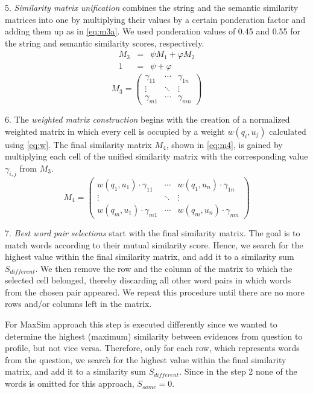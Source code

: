 \documentclass[conference]{IEEEtran}
\begin{document}
5. {\it Similarity matrix unification} combines the string and the semantic similarity matrices into one by multiplying their values by a certain ponderation factor and adding them up as in \ref{eq:m3a}. We used ponderation values of 0.45 and 0.55 for the string and semantic similarity scores, respectively.
\begin{eqnarray}
	\label{eq:m3a}
	M_3 & = & \psi M_1 + \varphi M_2 \\
	1 & = & \psi + \varphi
\end{eqnarray}
\begin{equation}
	\label{eq:m3b}
	M_3 = 
\left( 
	\begin{array}{ccc}
		\gamma_{11} & \cdots & \gamma_{1n} \\
		\vdots & \ddots & \vdots \\
		\gamma_{m1} & \cdots & \gamma_{mn} 
	\end{array} 
\right)
\end{equation}

6. The {\it weighted matrix construction} begins with the creation of a normalized weighted matrix in which every cell is occupied by a weight $w(q_i,u_j)$ calculated using \ref{eq:w}. The final similarity matrix $M_4$, shown in \ref{eq:m4}, is gained by multiplying each cell of the unified similarity matrix with the corresponding value $\gamma_{i,j}$ from $M_3$.
\begin{equation}
	\label{eq:m4}
	M_4 = 
\left( 
	\begin{array}{ccc}
		w(q_1,u_1)\cdot \gamma_{11} & \cdots & w(q_1,u_n)\cdot \gamma_{1n} \\
		\vdots & \ddots & \vdots \\
		w(q_m,u_1)\cdot \gamma_{m1} & \cdots & w(q_m,u_n)\cdot \gamma_{mn} 
	\end{array} 
\right)
\end{equation}

7. {\it Best word pair selections} start with the final similarity matrix. The goal is to match words according to their mutual similarity score. Hence, we search for the highest value within the final similarity matrix, and add it to a similarity sum $S_{different}$. We then remove the row and the column of the matrix to which the selected cell belonged, thereby discarding all other word pairs in which words from the chosen pair appeared. We repeat this procedure until there are no more rows and/or columns left in the matrix.
 
For MaxSim approach this step is executed differently since we wanted to determine the highest (maximum) similarity between evidences from question to profile, but not vice versa. Therefore, only for each row, which represents words from the question, we search for the highest value within the final similarity matrix, and add it to a similarity sum $S_{different}$. Since in the step 2 none of the words is omitted for this approach, $S_{same}=0$.
 
\end{document}
